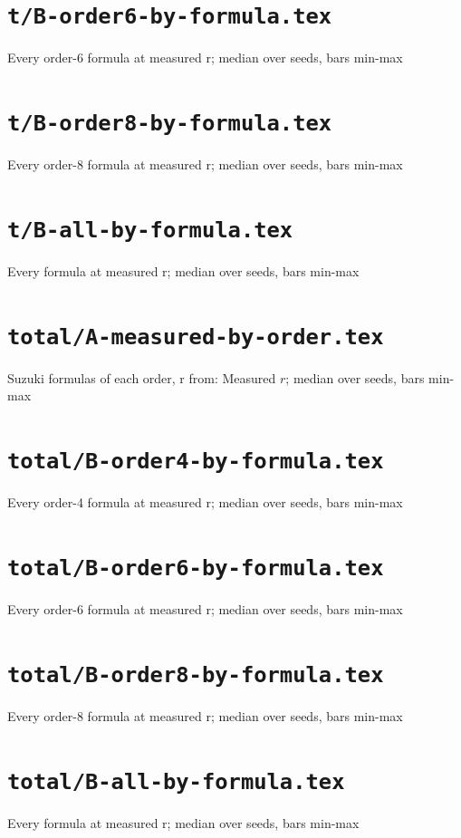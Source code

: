 \documentclass{article}
\begin{document}
\section*{\texttt{t/B-order6-by-formula.tex}}
Every order-6 formula at measured r; median over seeds, bars min-max\par\medskip

\clearpage

\section*{\texttt{t/B-order8-by-formula.tex}}
Every order-8 formula at measured r; median over seeds, bars min-max\par\medskip

\clearpage

\section*{\texttt{t/B-all-by-formula.tex}}
Every formula at measured r; median over seeds, bars min-max\par\medskip

\clearpage

\section*{\texttt{total/A-measured-by-order.tex}}
Suzuki formulas of each order, r from: Measured $r$; median over seeds, bars min-max\par\medskip

\clearpage

\section*{\texttt{total/B-order4-by-formula.tex}}
Every order-4 formula at measured r; median over seeds, bars min-max\par\medskip

\clearpage

\section*{\texttt{total/B-order6-by-formula.tex}}
Every order-6 formula at measured r; median over seeds, bars min-max\par\medskip

\clearpage

\section*{\texttt{total/B-order8-by-formula.tex}}
Every order-8 formula at measured r; median over seeds, bars min-max\par\medskip

\clearpage

\section*{\texttt{total/B-all-by-formula.tex}}
Every formula at measured r; median over seeds, bars min-max\par\medskip

\clearpage
\end{document}
